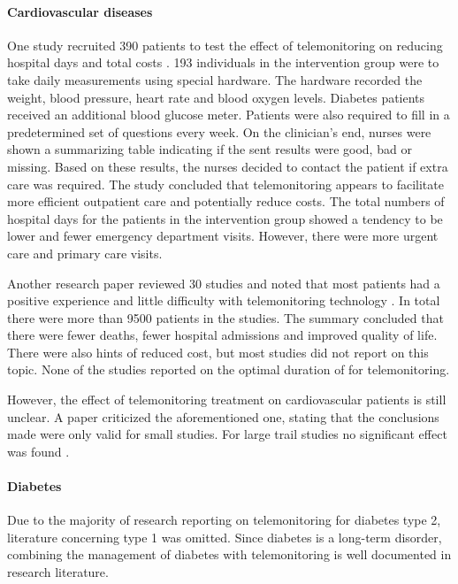         \paragraph{Cardiovascular diseases} One study recruited 390 patients to test the effect of telemonitoring on reducing hospital days and total costs \cite{tompkins2010randomized}. 193 individuals in the intervention group were to take daily measurements using special hardware. The hardware recorded the weight, blood pressure, heart rate and blood oxygen levels. Diabetes patients received an additional blood glucose meter. Patients were also required to fill in a predetermined set of questions every week. On the clinician's end, nurses were shown a summarizing table indicating if the sent results were good, bad or missing. Based on these results, the nurses decided to contact the patient if extra care was required. The study concluded that telemonitoring appears to facilitate more efficient outpatient care and potentially reduce costs. The total numbers of hospital days for the patients in the intervention group showed a tendency to be lower and fewer emergency department visits. However, there were more urgent care and primary care visits.

        Another research paper reviewed 30 studies and noted that most patients had a positive experience and little difficulty with telemonitoring technology \cite{inglis2010structured}. In total there were more than 9500 patients in the studies. The summary concluded that there were fewer deaths, fewer hospital admissions and improved quality of life. There were also hints of reduced cost, but most studies did not report on this topic. None of the studies reported on the optimal duration of for telemonitoring.
        
        However, the effect of telemonitoring treatment on cardiovascular patients is still unclear. A paper criticized the aforementioned one, stating that the conclusions made were only valid for small studies. For large trail studies no significant effect was found \cite{chaudhry2010telemonitoring}.

        \paragraph{Diabetes} Due to the majority of research reporting on telemonitoring for diabetes type 2, literature concerning type 1 was omitted. Since diabetes is a long-term disorder, combining the management of diabetes with telemonitoring is well documented in research literature.

